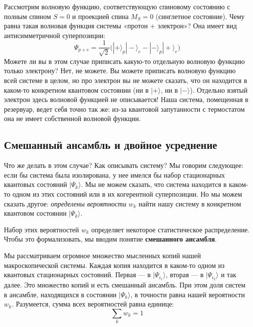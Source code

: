 \documentclass[../general/general]{subfiles}
\begin{document}

Рассмотрим волновую функцию, соответствующую спиновому состоянию с полным спином $S = 0$ и проекцией спина $M_S = 0$ (синглетное состояние). Чему равна такая волновая функция системы «протон + электрон»? Она имеет вид антисимметричной суперпозиции:
\begin{equation}
    \Psi_{p+e} = \frac{1}{\sqrt{2}} \Big( |+\rangle_p |-\rangle_e - |-\rangle_p |+\rangle_e \Big)
\end{equation}
Можете ли вы в этом случае приписать какую-то отдельную волновую функцию только электрону? Нет, не можете. Вы можете приписать волновую функцию всей системе в целом, но про электрон вы не можете сказать, что он находится в каком-то конкретном квантовом состоянии (ни в $|+\rangle$, ни в $|-\rangle$). Отдельно взятый электрон здесь волновой функцией не описывается! Наша система, помещенная в резервуар, ведет себя точно так же: из-за квантовой запутанности с термостатом она не имеет собственной волновой функции.

\subsection{Смешанный ансамбль и двойное усреднение}

Что же делать в этом случае? Как описывать систему? Мы говорим следующее: если бы система была изолирована, у нее имелся бы набор стационарных квантовых состояний $|\Psi_k\rangle$. Мы не можем сказать, что система находится в каком-то одном из этих состояний или в их когерентной суперпозиции. Но мы можем сказать другое: \textit{определены вероятности} $w_k$ найти нашу систему в конкретном квантовом состоянии $|\Psi_k\rangle$.

Набор этих вероятностей $w_k$ определяет некоторое статистическое распределение. Чтобы это формализовать, мы вводим понятие \textbf{смешанного ансамбля}. 


Мы рассматриваем огромное множество мысленных копий нашей макроскопической системы. Каждая копия находится в каком-то одном из квантовых стационарных состояний. Первая — в $|\Psi_{i_1}\rangle$, вторая — в $|\Psi_{i_2}\rangle$ и так далее. Это множество копий и есть смешанный ансамбль. При этом доля систем в ансамбле, находящихся в состоянии $|\Psi_k\rangle$, в точности равна нашей вероятности $w_k$. Разумеется, сумма всех вероятностей равна единице:
\begin{equation}
    \sum_k w_k = 1
\end{equation}
\end{document}
